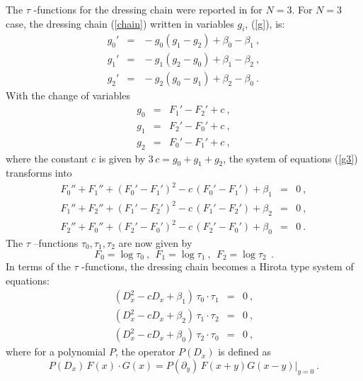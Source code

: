 \documentclass[a4paper,11pt]{article}
\begin{document}
The $\tau$ -functions for the dressing chain were reported in \cite{Okamoto} for
$N=3$.  For $N=3$ case, the dressing chain (\ref{chain}) written in variables $g_i$,
(\ref{g}), is:
\begin{eqnarray}
\label{g3}
g_0' \!\!\!&=&\!\!\! -g_0 (g_1-g_2) + \beta_0 - \beta_1~, \nonumber \\
g_1' \!\!\!&=&\!\!\! -g_1 (g_2-g_0) + \beta_1 - \beta_2~,  \\
g_2' \!\!\!&=&\!\!\! -g_2 (g_0-g_1) + \beta_2 - \beta_0~. \nonumber
\end{eqnarray}
With the change of variables
\begin{eqnarray}
\label{g-to-F}
g_0 \!\!\!&=&\!\!\! F_1' -F_2' +c ~,\nonumber \\
g_1 \!\!\!&=&\!\!\! F_2' -F_0' +c ~, \\
g_2 \!\!\!&=&\!\!\! F_0' -F_1' +c ~,\nonumber
\end{eqnarray}
where the constant $c$ is given by $3 \, c = g_0+g_1+g_2$, the system of equations
(\ref{g3}) transforms into
\begin{eqnarray}
\label{F}
F_0'' + F_1'' + (F_0' - F_1')^2 -c\,(F_0' - F_1') + \beta_1 \!\!\!&=&\!\!\! 0~, \nonumber \\
F_1'' + F_2'' + (F_1' - F_2')^2 -c\,(F_1' - F_2') + \beta_2 \!\!\!&=&\!\!\! 0~, \\
F_2'' + F_0'' + (F_2' - F_0')^2 -c\,(F_2' - F_0') + \beta_0 \!\!\!&=&\!\!\! 0~.\nonumber
\end{eqnarray}
The $\tau$ --functions $\tau_0, \tau_1, \tau_2$ are now given by
\begin{equation}
\label{F-tau}
F_0 = \log \tau_0~,~~F_1 = \log \tau_1~,~~F_2 = \log \tau_2~~.
\end{equation}
In terms of the $\tau$ -functions, the dressing chain becomes a Hirota type system
of equations:
\begin{eqnarray}
\label{tau}
(D_x^2 -c D_x +\beta_1)\, \tau_0 \cdot \tau_1 \!\!\!&=&\!\!\! 0~, \nonumber \\
(D_x^2 -c D_x +\beta_2)\, \tau_1 \cdot \tau_2 \!\!\!&=&\!\!\! 0~, \\
(D_x^2 -c D_x +\beta_0)\, \tau_2 \cdot \tau_0 \!\!\!&=&\!\!\! 0~, \nonumber
\end{eqnarray}
where for a polynomial $P$, the operator $P(D_x)$ is defined as
\begin{equation}
\label{P}
P(D_x)\,F(x)\cdot G(x) = P(\partial_y)\,F(x+y)G(x-y)|_{y=0}~.
\end{equation}
\end{document}
